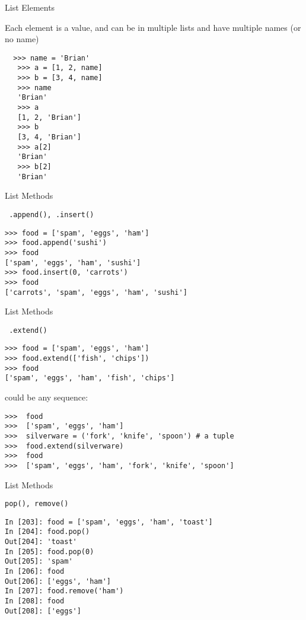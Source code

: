\documentclass{beamer}
\begin{document}
\begin{frame}[fragile]{List Elements}

{\Large Each element is a value, and can be in multiple lists and have multiple
names (or no name)}

\begin{verbatim}
  >>> name = 'Brian'
   >>> a = [1, 2, name]
   >>> b = [3, 4, name]
   >>> name
   'Brian'
   >>> a
   [1, 2, 'Brian']
   >>> b
   [3, 4, 'Brian']
   >>> a[2]
   'Brian'
   >>> b[2]
   'Brian'
\end{verbatim}

\end{frame} 

\begin{frame}[fragile]{List Methods}

{\Large \verb| .append(), .insert()|}

\begin{verbatim}
>>> food = ['spam', 'eggs', 'ham']
>>> food.append('sushi')
>>> food
['spam', 'eggs', 'ham', 'sushi']
>>> food.insert(0, 'carrots')
>>> food
['carrots', 'spam', 'eggs', 'ham', 'sushi']
\end{verbatim}

\end{frame} 

\begin{frame}[fragile]{List Methods}

{\large \verb| .extend()|}

\begin{verbatim}
>>> food = ['spam', 'eggs', 'ham']
>>> food.extend(['fish', 'chips'])
>>> food
['spam', 'eggs', 'ham', 'fish', 'chips']
\end{verbatim}

{\large could be any sequence:}

\begin{verbatim}
>>>  food
>>>  ['spam', 'eggs', 'ham']
>>>  silverware = ('fork', 'knife', 'spoon') # a tuple
>>>  food.extend(silverware)
>>>  food
>>>  ['spam', 'eggs', 'ham', 'fork', 'knife', 'spoon']
\end{verbatim}

\end{frame} 

\begin{frame}[fragile]{List Methods}

{\large \verb|pop(), remove() |}

\begin{verbatim}
In [203]: food = ['spam', 'eggs', 'ham', 'toast']
In [204]: food.pop()
Out[204]: 'toast'
In [205]: food.pop(0)
Out[205]: 'spam'
In [206]: food
Out[206]: ['eggs', 'ham']
In [207]: food.remove('ham')
In [208]: food
Out[208]: ['eggs']
\end{verbatim}
\end{frame} 
\end{document}
